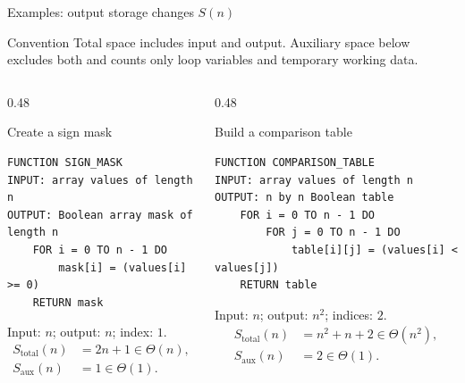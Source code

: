 \documentclass[aspectratio=169]{beamer}
\begin{document}
\begin{frame}[fragile]{Examples: output storage changes $S(n)$}
  \scriptsize
  \begin{block}{Convention}
    Total space includes input and output. Auxiliary space below excludes both
    and counts only loop variables and temporary working data.
  \end{block}
  \begin{columns}[T]
    \begin{column}{0.48\textwidth}
      \begin{exampleblock}{Create a sign mask}
\begin{lstlisting}[style=pseudo,basicstyle=\ttfamily\tiny]
FUNCTION SIGN_MASK
INPUT: array values of length n
OUTPUT: Boolean array mask of length n
    FOR i = 0 TO n - 1 DO
        mask[i] = (values[i] >= 0)
    RETURN mask
\end{lstlisting}
        Input: $n$; output: $n$; index: $1$.
        \[
          \begin{aligned}
            S_{\mathrm{total}}(n)&=2n+1\in\Theta(n),\\
            S_{\mathrm{aux}}(n)&=1\in\Theta(1).
          \end{aligned}
        \]
      \end{exampleblock}
    \end{column}
    \begin{column}{0.48\textwidth}
      \begin{block}{Build a comparison table}
\begin{lstlisting}[style=pseudo,basicstyle=\ttfamily\tiny]
FUNCTION COMPARISON_TABLE
INPUT: array values of length n
OUTPUT: n by n Boolean table
    FOR i = 0 TO n - 1 DO
        FOR j = 0 TO n - 1 DO
            table[i][j] = (values[i] < values[j])
    RETURN table
\end{lstlisting}
        Input: $n$; output: $n^2$; indices: $2$.
        \[
          \begin{aligned}
            S_{\mathrm{total}}(n)&=n^2+n+2\in\Theta(n^2),\\
            S_{\mathrm{aux}}(n)&=2\in\Theta(1).
          \end{aligned}
        \]
      \end{block}
    \end{column}
  \end{columns}
\end{frame}
\end{document}
